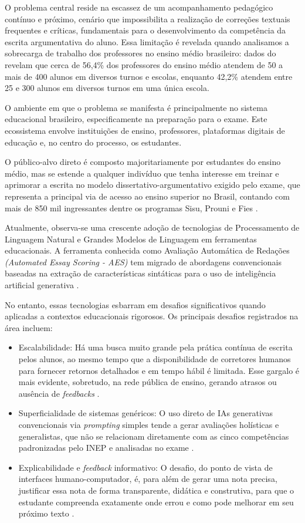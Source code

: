 \documentclass[12pt]{article}
\begin{document}
O problema central reside na escassez de um acompanhamento pedagógico contínuo e próximo, cenário que impossibilita a realização de correções textuais frequentes e críticas, fundamentais para o desenvolvimento da competência da escrita argumentativa do aluno. Essa limitação é revelada quando analisamos a sobrecarga de trabalho dos professores no ensino médio brasileiro: dados do  revelam que cerca de 56,4\% dos professores do ensino médio atendem de 50 a mais de 400 alunos em diversos turnos e escolas, enquanto 42,2\% atendem entre 25 e 300 alunos em diversos turnos em uma única escola.

O ambiente em que o problema se manifesta é principalmente no sistema educacional brasileiro, especificamente na preparação para o exame. Este ecossistema envolve instituições de ensino, professores, plataformas digitais de educação e, no centro do processo, os estudantes.

O público-alvo direto é composto majoritariamente por estudantes do ensino médio, mas se estende a qualquer indivíduo que tenha interesse em treinar e aprimorar a escrita no modelo dissertativo-argumentativo exigido pelo exame, que representa a principal via de acesso ao ensino superior no Brasil, contando com mais de 850 mil ingressantes dentre os programas Sisu, Prouni e Fies \cite{sisu2024, inepCenso2024}.

Atualmente, observa-se uma crescente adoção de tecnologias de Processamento de Linguagem Natural e Grandes Modelos de Linguagem em ferramentas educacionais. A ferramenta conhecida como Avaliação Automática de Redações \textit{(Automated Essay Scoring - AES)} tem migrado de abordagens convencionais baseadas na extração de características sintáticas para o uso de inteligência artificial generativa \cite{aesSoTA}.

No entanto, essas tecnologias esbarram em desafios significativos quando aplicadas a contextos educacionais rigorosos. Os principais desafios registrados na área incluem:

\begin{itemize}
    \item Escalabilidade: Há uma busca muito grande pela prática contínua de escrita pelos alunos, ao mesmo tempo que a disponibilidade de corretores humanos para fornecer retornos detalhados e em tempo hábil é limitada. Esse gargalo é mais evidente, sobretudo, na rede pública de ensino, gerando atrasos ou ausência de \textit{feedbacks} \cite{enemIA}.
    \item Superficialidade de sistemas genéricos: O uso direto de IAs generativas convencionais via \textit{prompting} simples tende a gerar avaliações holísticas e generalistas, que não se relacionam diretamente com as cinco competências padronizadas pelo INEP e analisadas no exame \cite{agenticEdu}.
    \item Explicabilidade e \textit{feedback} informativo: O desafio, do ponto de vista de interfaces humano-computador, é, para além de gerar uma nota precisa, justificar essa nota de forma transparente, didática e construtiva, para que o estudante compreenda exatamente onde errou e como pode melhorar em seu próximo texto \cite{agenticEdu}.
\end{itemize}
\end{document}
